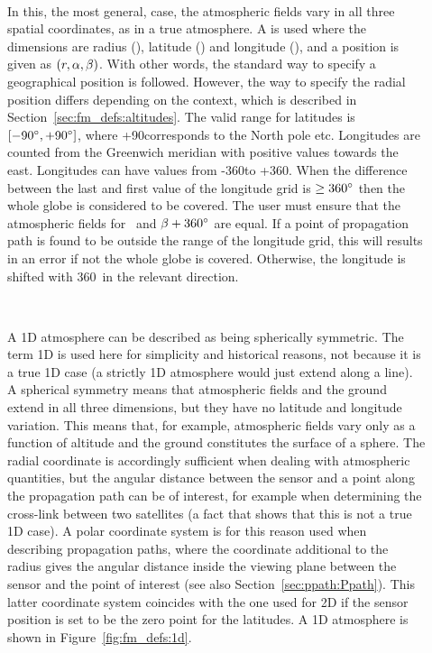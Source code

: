 \begin{description}
  
\item[\,\,\,] In this, the most general, case, the
  atmospheric fields vary in all three spatial coordinates, as in a
  true atmosphere. A  is used where the
  dimensions are radius (\Rds), latitude (\Lat) and longitude (\Lon),
  and a position is given as $(r,\alpha,\beta)$. With other words, the
  standard way to specify a geographical position is followed.
  However, the way to specify the radial position differs depending on
  the context, which is described in
  Section~\ref{sec:fm_defs:altitudes}. The valid range for latitudes
  is $[-90^\circ,+90^\circ]$, where +90\degree corresponds to the
  North pole etc. Longitudes are counted from the Greenwich meridian
  with positive values towards the east. Longitudes can have values
  from -360\degree to +360\degree. When the difference between the
  last and first value of the longitude grid is $\geq 360^\circ$ then
  the whole globe is considered to be covered. The user must ensure
  that the atmospheric fields for \Lon\ and $\beta+360^\circ$ are
  equal. If a point of propagation path is found to be outside the
  range of the longitude grid, this will results in an error if not
  the whole globe is covered. Otherwise, the longitude is shifted with
  360\degree\ in the relevant direction.
  
\item[\,\,\,] A 1D atmosphere can be described as being
  spherically symmetric. The term 1D is used here for simplicity and
  historical reasons, not because it is a true 1D case (a strictly 1D
  atmosphere would just extend along a line). A spherical symmetry
  means that atmospheric fields and the ground extend in all three
  dimensions, but they have no latitude and longitude variation. This
  means that, for example, atmospheric fields vary only as a function
  of altitude and the ground constitutes the surface of a sphere. The
  radial coordinate is accordingly sufficient when dealing with
  atmospheric quantities, but the angular distance between the sensor
  and a point along the propagation path can be of interest, for
  example when determining the cross-link between two satellites (a
  fact that shows that this is not a true 1D case). A polar coordinate
  system is for this reason used when describing propagation paths,
  where the coordinate additional to the radius gives the angular
  distance inside the viewing plane between the sensor and the point
  of interest (see also Section~\ref{sec:ppath:Ppath}). This latter
  coordinate system coincides with the one used for 2D if the sensor
  position is set to be the zero point for the latitudes. A 1D
  atmosphere is shown in Figure~\ref{fig:fm_defs:1d}.
  

\end{description}
